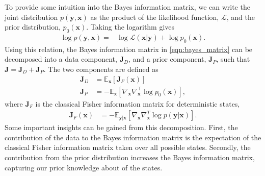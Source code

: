 \documentclass{article}
\renewcommand{\vec}[1]{\ensuremath{{\boldsymbol #1}}}
\newcommand{\mat}[1]{\ensuremath{\boldsymbol{#1}}}
\begin{document}
To provide some intuition into the Bayes information matrix, we can write the joint distribution $p(\mathbf{y},\mathbf{x})$ as the product of the likelihood function, $\mathcal L$, and the prior distribution, $p_0(\mathbf{x})$. Taking the logarithm gives
\begin{align}
	\log p(\mathbf{y},\mathbf{x}) =& \log\mathcal{L}(\mathbf{x}|\mathbf{y}) + \log p_0(\mathbf{x}).
\end{align}
Using this relation, the Bayes information matrix in \eqref{eqn:bayes_matrix} can be decomposed into a data component, $\mathbf{J}_D$, and a prior component, $\mathbf{J}_P$, such that $\mathbf{J} = \mathbf{J}_D + \mathbf{J}_P$.
The two components are defined as
\begin{align}
	\mathbf{J}_D &= \mathbb E_{\mathbf{x}}\left[ \mathbf{J}_F(\mathbf{x}) \right]  \\
	\mathbf{J}_P &= -\mathbb E_{\mathbf{x}}\left[ \nabla_{\mathbf{x}}\nabla_{\mathbf{x}}^{\top} \log p_0(\mathbf{x}) \right],
\end{align}
where $\mathbf{J}_F$ is the classical Fisher information matrix for deterministic states,
\begin{align}
	\mat J_F(\vec x) &= -\mathbb E_{\vec y| \vec x}\left[ \nabla_{\vec x}\nabla_{\vec x}^T \log p(\vec y|\vec x) \right].
\end{align}
Some important insights can be gained from this decomposition. First, the contribution of the data to the Bayes information matrix is the expectation of the classical Fisher information matrix taken over all possible states. Secondly, the contribution from the prior distribution increases the Bayes information matrix, capturing our prior knowledge about of the states.
\end{document}
